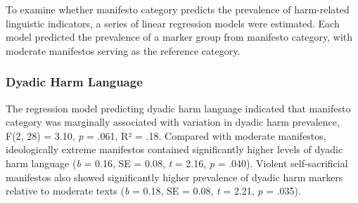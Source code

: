 \documentclass[
  english,
  man,floatsintext]{apa6}
\begin{document}
To examine whether manifesto category predicts the prevalence of harm-related linguistic indicators, a series of linear regression models were estimated. Each model predicted the prevalence of a marker group from manifesto category, with moderate manifestos serving as the reference category.

\subsubsection{Dyadic Harm Language}\label{dyadic-harm-language}

The regression model predicting dyadic harm language indicated that manifesto category was marginally associated with variation in dyadic harm prevalence, F(2, 28) = 3.10, \emph{p} = .061, R² = .18. Compared with moderate manifestos, ideologically extreme manifestos contained significantly higher levels of dyadic harm language (\emph{b} = 0.16, SE = 0.08, \emph{t} = 2.16, \emph{p} = .040). Violent self-sacrificial manifestos also showed significantly higher prevalence of dyadic harm markers relative to moderate texts (\emph{b} = 0.18, SE = 0.08, \emph{t} = 2.21, \emph{p} = .035).
\end{document}
